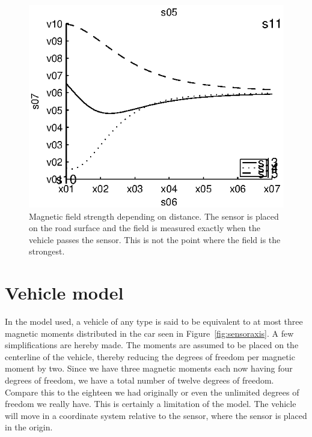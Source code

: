 \begin{figure}[htbp]
 \centering
 \begin{minipage}{0.6\linewidth}
 
 \includegraphics[width=1\linewidth]{images/distance}
 \caption[Simulated magnetic field strength depending on distance]{Magnetic field strength depending on distance. The sensor is placed on the road surface and the field is measured exactly when the vehicle passes the sensor. This is not the point where the field is the strongest.}
 \label{fig:distance}
 \end{minipage}
\end{figure}

\section{Vehicle model}
In the model used, a vehicle of any type is said to be equivalent to at most three magnetic moments distributed in the car seen in \mbox{Figure \ref{fig:sensoraxis}}. A few simplifications are hereby made. The moments are assumed to be placed on the centerline of the vehicle, thereby reducing the degrees of freedom per magnetic moment by two. Since we have three magnetic moments each now having four degrees of freedom, we have a total number of twelve degrees of freedom. Compare this to the eighteen we had originally or even the unlimited degrees of freedom we really have. This is certainly a limitation of the model. The vehicle will move in a coordinate system relative to the sensor, where the sensor is placed in the origin.

